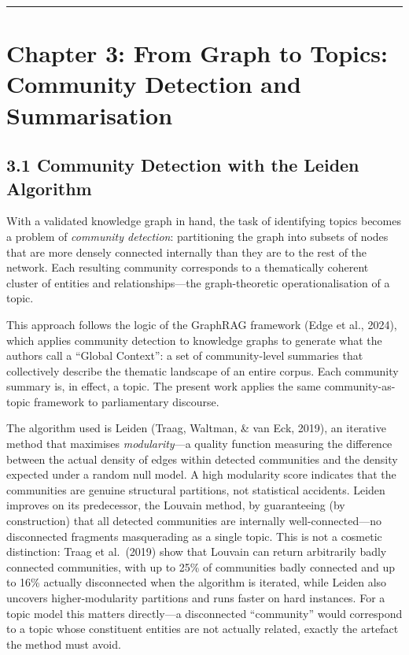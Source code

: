 \documentclass[11pt]{article}
\begin{document}
\hrule

\section{Chapter 3: From Graph to Topics: Community Detection and Summarisation}

\subsection{3.1 Community Detection with the Leiden Algorithm}

With a validated knowledge graph in hand, the task of identifying topics becomes a problem of \emph{community detection}: partitioning the graph into subsets of nodes that are more densely connected internally than they are to the rest of the network. Each resulting community corresponds to a thematically coherent cluster of entities and relationships---the graph-theoretic operationalisation of a topic.

This approach follows the logic of the GraphRAG framework (Edge et al., 2024), which applies community detection to knowledge graphs to generate what the authors call a ``Global Context'': a set of community-level summaries that collectively describe the thematic landscape of an entire corpus. Each community summary is, in effect, a topic. The present work applies the same community-as-topic framework to parliamentary discourse.

The algorithm used is Leiden (Traag, Waltman, \& van Eck, 2019), an iterative method that maximises \emph{modularity}---a quality function measuring the difference between the actual density of edges within detected communities and the density expected under a random null model. A high modularity score indicates that the communities are genuine structural partitions, not statistical accidents. Leiden improves on its predecessor, the Louvain method, by guaranteeing (by construction) that all detected communities are internally well-connected---no disconnected fragments masquerading as a single topic. This is not a cosmetic distinction: Traag et al.\ (2019) show that Louvain can return arbitrarily badly connected communities, with up to 25\% of communities badly connected and up to 16\% actually disconnected when the algorithm is iterated, while Leiden also uncovers higher-modularity partitions and runs faster on hard instances. For a topic model this matters directly---a disconnected ``community'' would correspond to a topic whose constituent entities are not actually related, exactly the artefact the method must avoid.
\end{document}
